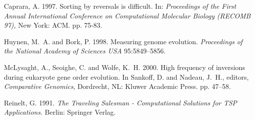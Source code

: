 \documentclass[twoside]{article}
\begin{document}
\footnotesize 
 \begin{thebibliography}{99}
 
 Caprara, A. 1997. Sorting by reversals is difficult. In: {\em
Proceedings of the First Annual International Conference on Computational
Molecular Biology (RECOMB 97),} New York: ACM.  pp. 75-83.

 Huynen, M.~A. and Bork, P. 1998. Measuring genome evolution. {\em
Proceedings of the National Academy of Sciences USA}
  95:5849--5856.

McLysaght, A., Seoighe, C. and Wolfe, K.~H. 2000. High frequency
of inversions during eukaryote gene order evolution.     In Sankoff, D. and
Nadeau, J.~H., editors, {\em Comparative Genomics},  Dordrecht, NL: Kluwer
Academic Press. pp. 47--58.

 Reinelt, G. 1991. {\em The Traveling Salesman - Computational
Solutions for TSP Applications.} Berlin: Springer Verlag. 
 
\end{thebibliography}
\end{document}
